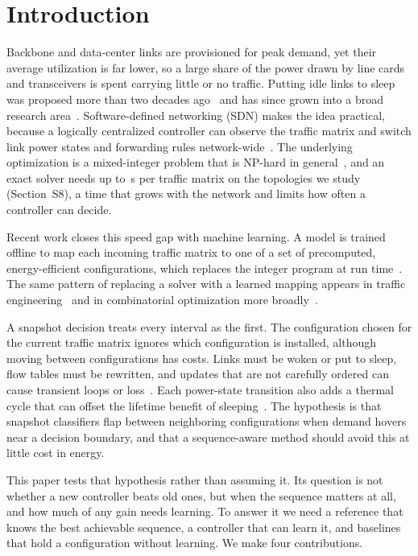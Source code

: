 \documentclass[5p,times]{elsarticle}
\begin{document}
\section{Introduction}

Backbone and data-center links are provisioned for peak demand, yet their average utilization is far lower, so a large share of the power drawn by line cards and transceivers is spent carrying little or no traffic. Putting idle links to sleep was proposed more than two decades ago~\cite{gupta2003greening} and has since grown into a broad research area~\cite{bianzino2012survey,bolla2011energy}. Software-defined networking (SDN) makes the idea practical, because a logically centralized controller can observe the traffic matrix and switch link power states and forwarding rules network-wide~\cite{mckeown2008openflow,kreutz2015sdn}. The underlying optimization is a mixed-integer problem that is NP-hard in general~\cite{chiaraviglio2012minimizing}, and an exact solver needs up to \ilpTA\,s per traffic matrix on the topologies we study (Section~S8), a time that grows with the network and limits how often a controller can decide.

Recent work closes this speed gap with machine learning. A model is trained offline to map each incoming traffic matrix to one of a set of precomputed, energy-efficient configurations, which replaces the integer program at run time~\cite{gomezdelahiz2025noms,gomezdelahiz2026tgcn}. The same pattern of replacing a solver with a learned mapping appears in traffic engineering~\cite{xu2023teal,perry2023dote,abuzaid2021ncflow,almasan2022enero} and in combinatorial optimization more broadly~\cite{bengio2021mlco}.

A snapshot decision treats every interval as the first. The configuration chosen for the current traffic matrix ignores which configuration is installed, although moving between configurations has costs. Links must be woken or put to sleep, flow tables must be rewritten, and updates that are not carefully ordered can cause transient loops or loss~\cite{reitblatt2012abstractions,jin2014dionysus}. Each power-state transition also adds a thermal cycle that can offset the lifetime benefit of sleeping~\cite{chiaraviglio2015lifetime,chiaraviglio2014impact}. The hypothesis is that snapshot classifiers flap between neighboring configurations when demand hovers near a decision boundary, and that a sequence-aware method should avoid this at little cost in energy.

This paper tests that hypothesis rather than assuming it. Its question is not whether a new controller beats old ones, but when the sequence matters at all, and how much of any gain needs learning. To answer it we need a reference that knows the best achievable sequence, a controller that can learn it, and baselines that hold a configuration without learning. We make four contributions.
\end{document}
